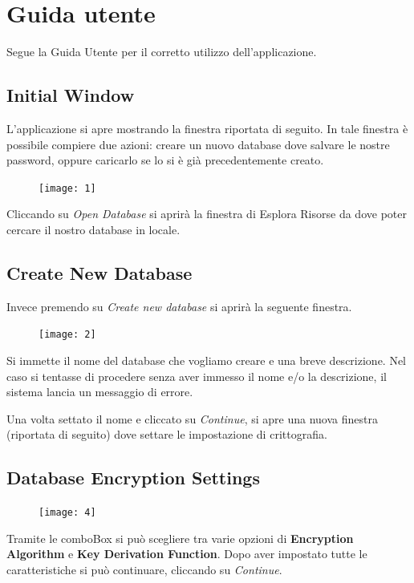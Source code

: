 \documentclass[a4paper,12pt]{report}
\begin{document}
\appendix
\chapter{Guida utente}

Segue la Guida Utente per il corretto utilizzo dell'applicazione.

\section*{Initial Window}
L’applicazione si apre mostrando la finestra riportata di seguito. In tale finestra è possibile compiere due azioni: creare un nuovo database dove salvare le nostre password, oppure caricarlo se lo si è già precedentemente creato.

\begin{figure}[h]
\centering{}
\texttt{[image: 1]}
\end{figure}

Cliccando su \textit{Open Database} si aprirà la finestra di Esplora Risorse da dove poter cercare il nostro database in locale.


\section*{Create New Database}
Invece premendo su \textit{Create new database} si aprirà la seguente finestra.

\begin{figure}[h]
\centering{}
\texttt{[image: 2]}
\end{figure}

Si immette il nome del database che vogliamo creare e una breve descrizione. Nel caso si tentasse di procedere senza aver immesso il nome e/o la descrizione, il sistema lancia un messaggio di errore.

Una volta settato il nome e cliccato su \textit{Continue}, si apre una nuova finestra (riportata di seguito) dove settare le impostazione di crittografia.

\clearpage

\section*{Database Encryption Settings}

\begin{figure}[h]
\centering{}
\texttt{[image: 4]}
\end{figure}

Tramite le comboBox si può scegliere tra varie opzioni di \textbf{Encryption Algorithm} e \textbf{Key Derivation Function}. Dopo aver impostato tutte le caratteristiche si può continuare, cliccando su \textit{Continue}.
\end{document}
